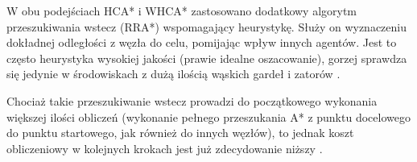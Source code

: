 W obu podejściach HCA* i WHCA* zastosowano dodatkowy algorytm przeszukiwania wstecz (RRA*) wspomagający heurystykę. Służy on wyznaczeniu dokładnej odległości z węzła do celu, pomijając wpływ innych agentów. Jest to często heurystyka wysokiej jakości (prawie idealne oszacowanie), gorzej sprawdza się jedynie w środowiskach z dużą ilością wąskich gardeł i zatorów \cite{rtcooppathfinding}.

Chociaż takie przeszukiwanie wstecz prowadzi do początkowego wykonania większej ilości obliczeń (wykonanie pełnego przeszukania A* z punktu docelowego do punktu startowego, jak również do innych węzłów), to jednak koszt obliczeniowy w kolejnych krokach jest już zdecydowanie niższy \cite{rtcooppathfinding}.

